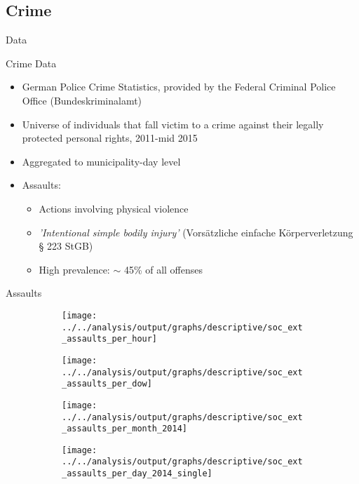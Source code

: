 \documentclass[usenames,dvipsnames]{beamer} %
\begin{document}
	\subsection{Crime}
	\begin{frame}{Data}\label{CRIME_DATA}
		\begin{block}{Crime Data}
			\begin{itemize}
				\item German Police Crime Statistics, provided by the Federal Criminal Police Office (Bundeskriminalamt)
				\item Universe of individuals that fall victim to a crime against their legally protected personal rights, 2011-mid 2015
				\item Aggregated to municipality-day level
				\item Assaults: 
				\begin{itemize}
					\item Actions involving physical violence
					\item \textit{'Intentional simple bodily injury'} (Vorsätzliche einfache
					Körperverletzung § 223 StGB)
					\item High prevalence: $\sim$ 45\% of all offenses\newline \hyperlink{CRIMINAL_OFFENSE_CODES}{}
				\end{itemize}
			\end{itemize}
		\end{block}	
	\end{frame}




	\begin{frame}{Assaults}
		\begin{figure}
			\begin{subfigure}[h]{0.48\linewidth}\centering
				\texttt{[image: ../../analysis/output/graphs/descriptive/soc\_ext\_assaults\_per\_hour]}
			\end{subfigure}
			\begin{subfigure}[h]{0.48\linewidth}\centering
				\texttt{[image: ../../analysis/output/graphs/descriptive/soc\_ext\_assaults\_per\_dow]}
			\end{subfigure}
			\begin{subfigure}[h]{0.48\linewidth}\centering
				\texttt{[image: ../../analysis/output/graphs/descriptive/soc\_ext\_assaults\_per\_month\_2014]}
			\end{subfigure}
			\begin{subfigure}[h]{0.48\linewidth}\centering
				\texttt{[image: ../../analysis/output/graphs/descriptive/soc\_ext\_assaults\_per\_day\_2014\_single]}
			\end{subfigure}
		\end{figure}
	\end{frame}
\end{document}
